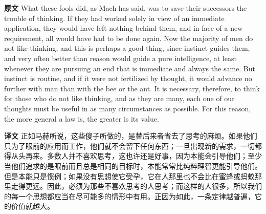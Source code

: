 \documentclass[UTF8]{ctexart}
\newenvironment{english}{\par\small\noindent\textbf{原文}\quad\ignorespaces}{\par}
\newenvironment{zhtranslation}{\par\noindent\textbf{译文}\quad\ignorespaces}{\par\vspace{0.35em}}
\begin{document}
\begin{english}
What these fools did, as Mach has said, was to save their successors the trouble of thinking. If they had worked solely in view of an immediate application, they would have left nothing behind them, and in face of a new requirement, all would have had to be done again. Now the majority of men do not like thinking, and this is perhaps a good thing, since instinct guides them, and very often better than reason would guide a pure intelligence, at least whenever they are pursuing an end that is immediate and always the same. But instinct is routine, and if it were not fertilized by thought, it would advance no further with man than with the bee or the ant. It is necessary, therefore, to think for those who do not like thinking, and as they are many, each one of our thoughts must be useful in as many circumstances as possible. For this reason, the more general a law is, the greater is its value.
\end{english}
\begin{zhtranslation}
正如马赫所说，这些傻子所做的，是替后来者省去了思考的麻烦。如果他们只为了眼前的应用而工作，他们就不会留下任何东西；一旦出现新的需求，一切都得从头再来。多数人并不喜欢思考，这也许还是好事，因为本能会引导他们；至少当他们追求的是眼前而且总是相同的目标时，本能常常比纯粹理智更能引导他们。但是本能只是惯例；如果没有思想使它受孕，它在人那里也不会比在蜜蜂或蚂蚁那里走得更远。因此，必须为那些不喜欢思考的人思考；而这样的人很多，所以我们的每一个思想都应当在尽可能多的情形中有用。正因为如此，一条定律越普遍，它的价值就越大。\end{zhtranslation}
\end{document}
